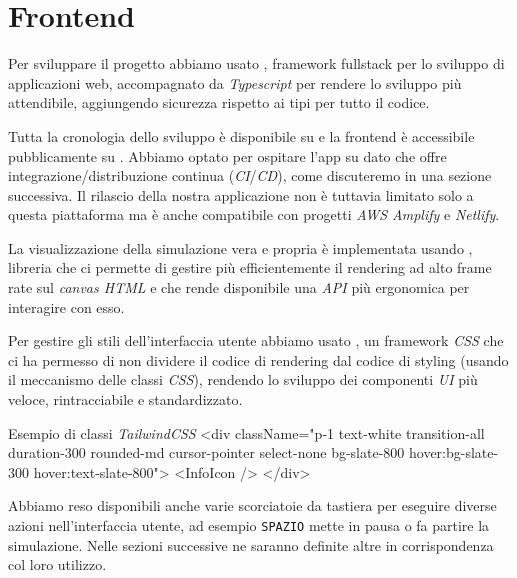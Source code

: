 \section{Frontend}

Per sviluppare il progetto abbiamo usato , framework fullstack per lo sviluppo di applicazioni web, accompagnato da \textit{Typescript} per rendere lo sviluppo più attendibile, aggiungendo sicurezza rispetto ai tipi per tutto il codice.

Tutta la cronologia dello sviluppo è disponibile su  e la frontend è accessibile pubblicamente su .
Abbiamo optato per ospitare l'app su  dato che offre integrazione/distribuzione continua (\textit{CI}/\textit{CD}), come discuteremo in una sezione successiva.  Il rilascio della nostra applicazione non è tuttavia limitato solo a questa piattaforma ma è anche compatibile con progetti \textit{AWS Amplify} e \textit{Netlify}.

La visualizzazione della simulazione vera e propria è implementata usando , libreria che ci permette di gestire più efficientemente il rendering ad alto frame rate sul \textit{canvas HTML} e che rende disponibile una \textit{API} più ergonomica per interagire con esso.

Per gestire gli stili dell'interfaccia utente abbiamo usato , un framework \textit{CSS} che ci ha permesso di non dividere il codice di rendering dal codice di styling (usando il meccanismo delle classi \textit{CSS}), rendendo lo sviluppo dei componenti \textit{UI} più veloce, rintracciabile e standardizzato.

\begin{tsxCode}{Esempio di classi \textit{TailwindCSS}}
<div className="p-1 text-white transition-all duration-300 rounded-md cursor-pointer select-none bg-slate-800 hover:bg-slate-300 hover:text-slate-800">
      <InfoIcon />
</div>
\end{tsxCode}

Abbiamo reso disponibili anche varie scorciatoie da tastiera per eseguire diverse azioni nell'interfaccia utente, ad esempio \texttt{SPAZIO} mette in pausa o fa partire la simulazione. Nelle sezioni successive ne saranno definite altre in corrispondenza col loro utilizzo.

